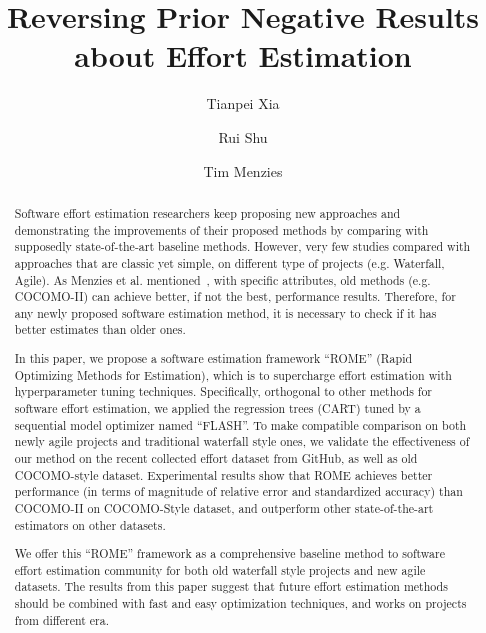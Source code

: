 \documentclass[sigconf,review]{acmart}
\begin{document}
\title{Reversing Prior Negative Results about Effort Estimation}

\author{Tianpei Xia}

\author{Rui Shu}

\author{Tim Menzies}

\renewcommand{\shortauthors}{Xia et al.}
\renewcommand{\textrightarrow}{$\rightarrow$}


\begin{abstract}
Software effort estimation researchers keep proposing new approaches and  demonstrating the improvements of their proposed methods by comparing with supposedly state-of-the-art baseline methods. However, very few studies compared with approaches that are classic yet simple, on different type of projects (e.g. Waterfall, Agile). As Menzies et al. mentioned~\cite{MenziesNeg:2017}, with specific attributes, old methods (e.g. COCOMO-II) can achieve better, if not the best, performance results. Therefore, for any newly proposed software estimation method, it is necessary to check if it has better estimates than older ones.
 
In this paper, we propose a software estimation framework ``ROME'' (Rapid Optimizing Methods for Estimation), which is to supercharge effort estimation with hyperparameter tuning techniques. Specifically, orthogonal to other methods for software effort estimation, we applied the regression trees (CART) tuned by a sequential model optimizer named ``FLASH''. To make compatible comparison on both newly agile projects and traditional waterfall style ones, we validate the effectiveness of our method on the recent collected effort dataset from GitHub, as well as old COCOMO-style dataset. Experimental results show that ROME achieves better performance (in terms of magnitude of relative error and standardized accuracy) than COCOMO-II on COCOMO-Style dataset, and outperform other state-of-the-art estimators on other datasets. 

We offer this ``ROME'' framework as a comprehensive baseline method to software effort estimation community for both old waterfall style projects and new agile datasets. The results from this paper suggest that future effort estimation methods should be combined with fast and easy optimization techniques, and works on projects from different era.
\end{abstract}
\end{document}
